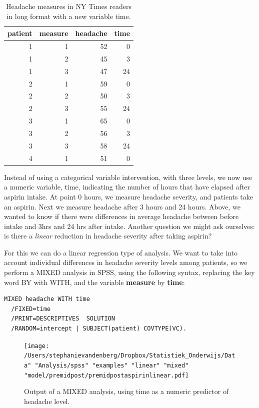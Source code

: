 \documentclass[]{book}\usepackage[]{graphicx}\usepackage[]{color}
\begin{document}
\begin{table}[ht]
\centering
\caption{Headache measures in NY Times readers in long format with a new variable time.} 
\label{tab:analysispremidpost3}
\begin{tabular}{rrrr}
  \hline
patient & measure & headache & time \\ 
  \hline
1 & 1 & 52 & 0 \\ 
  1 & 2 & 45 & 3 \\ 
  1 & 3 & 47 & 24 \\ 
  2 & 1 & 59 & 0 \\ 
  2 & 2 & 50 & 3 \\ 
  2 & 3 & 55 & 24 \\ 
  3 & 1 & 65 & 0 \\ 
  3 & 2 & 56 & 3 \\ 
  3 & 3 & 58 & 24 \\ 
  4 & 1 & 51 & 0 \\ 
   \hline
\end{tabular}
\end{table}

 
 
Instead of using a categorical variable intervention, with three levels, we now use a numeric variable, time, indicating the number of hours that have elapsed after aspirin intake. At point 0 hours, we measure headache severity, and patients take an aspirin. Next we measure headache after 3 hours and 24 hours. Above, we wanted to know if there were differences in average headache between before intake and 3hrs and 24 hrs after intake. Another question we might ask ourselves: is there a \textit{linear} reduction in headache severity after taking aspirin?

For this we can do a linear regression type of analysis. We want to take into account individual differences in headache severity levels among patients, so we perform a MIXED analysis in SPSS, using the following syntax, replacing the key word BY with WITH, and the variable \textbf{measure} by \textbf{time}:

\begin{verbatim}
MIXED headache WITH time
  /FIXED=time
  /PRINT=DESCRIPTIVES  SOLUTION
  /RANDOM=intercept | SUBJECT(patient) COVTYPE(VC).
\end{verbatim}




\begin{figure}[h]
\label{fig:premidpostaspirinlinear}
    \begin{center}
       \texttt{[image: /Users/stephanievandenberg/Dropbox/Statistiek\_Onderwijs/Data" "Analysis/spss" "examples" "linear" "mixed" "model/premidpost/premidpostaspirinlinear.pdf]}
    \end{center}
    \caption{Output of a MIXED analysis, using time as a numeric predictor of headache level.}
\end{figure}
\end{document}
